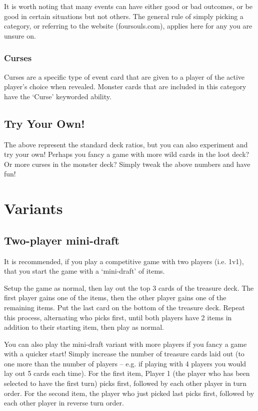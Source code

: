 \documentclass[
  fontsize=10pt,
  paper=a5,
  version=last,
  chapterprefix=true,
  bindingoffset=5mm,
  ]{scrbook}
\begin{document}
    It is worth noting that many events can have either good or bad outcomes, or be good in certain situations but not others. The general rule of simply picking a category, or referring to the website (foursouls.com), applies here for any you are unsure on.
    \subsection*{Curses}
    Curses are a specific type of event card that are given to a player of the active player’s choice when revealed. Monster cards that are included in this category have the ‘Curse’ keyworded ability.
    \section{Try Your Own!}
    The above represent the standard deck ratios, but you can also experiment and try your own! Perhaps you fancy a game with more wild cards in the loot deck? Or more curses in the monster deck? Simply tweak the above numbers and have fun!

    \chapter{Variants}
    \section{Two-player mini-draft}
    It is recommended, if you play a competitive game with two players (i.e. 1v1), that you start the game with a ‘mini-draft’ of items.
    
    Setup the game as normal, then lay out the top 3 cards of the treasure deck. The first player gains one of the items, then the other player gains one of the remaining items. Put the last card on the bottom of the treasure deck. Repeat this process, alternating who picks first, until both players have 2 items in addition to their starting item, then play as normal.
    
    You can also play the mini-draft variant with more players if you fancy a game with a quicker start! Simply increase the number of treasure cards laid out (to one more than the number of players – e.g. if playing with 4 players you would lay out 5 cards each time). For the first item, Player 1 (the player who has been selected to have the first turn) picks first, followed by each other player in turn order. For the second item, the player who just picked last picks first, followed by each other player in reverse turn order.
\end{document}
